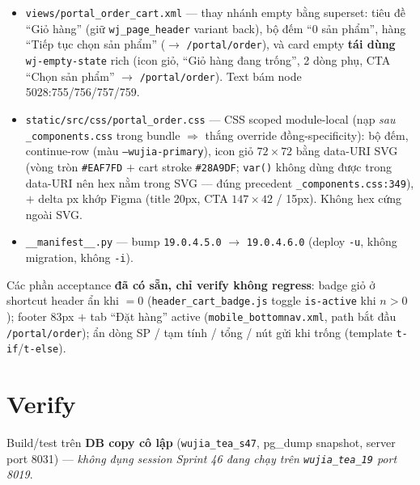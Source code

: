 \begin{itemize}
  \item \texttt{views/portal\_order\_cart.xml} --- thay nhánh empty bằng superset: tiêu đề
    ``Giỏ hàng'' (giữ \texttt{wj\_page\_header} variant back), bộ đếm ``0 sản phẩm'', hàng
    ``Tiếp tục chọn sản phẩm'' ($\rightarrow$ \texttt{/portal/order}), và card empty
    \textbf{tái dùng} \texttt{wj-empty-state} rich (icon giỏ, ``Giỏ hàng đang trống'', 2 dòng
    phụ, CTA ``Chọn sản phẩm'' $\rightarrow$ \texttt{/portal/order}). Text bám node
    5028:755/756/757/759.
  \item \texttt{static/src/css/portal\_order.css} --- CSS scoped module-local (nạp \emph{sau}
    \texttt{\_components.css} trong bundle $\Rightarrow$ thắng override đồng-specificity):
    bộ đếm, continue-row (màu \texttt{--wujia-primary}), icon giỏ $72\times72$ bằng data-URI
    SVG (vòng tròn \texttt{\#EAF7FD} $+$ cart stroke \texttt{\#28A9DF}; \texttt{var()} không
    dùng được trong data-URI nên hex nằm trong SVG --- đúng precedent
    \texttt{\_components.css:349}), $+$ delta px khớp Figma (title 20px, CTA $147\times42$ /
    15px). Không hex cứng ngoài SVG.
  \item \texttt{\_\_manifest\_\_.py} --- bump \texttt{19.0.4.5.0} $\rightarrow$
    \texttt{19.0.4.6.0} (deploy \texttt{-u}, không migration, không \texttt{-i}).
\end{itemize}

Các phần acceptance \textbf{đã có sẵn, chỉ verify không regress}: badge giỏ ở shortcut header
ẩn khi $=0$ (\texttt{header\_cart\_badge.js} toggle \texttt{is-active} khi $n>0$); footer
83px $+$ tab ``Đặt hàng'' active (\texttt{mobile\_bottomnav.xml}, path bắt đầu
\texttt{/portal/order}); ẩn dòng SP / tạm tính / tổng / nút gửi khi trống (template
\texttt{t-if}/\texttt{t-else}).

\section{Verify}

Build/test trên \textbf{DB copy cô lập} (\texttt{wujia\_tea\_s47}, pg\_dump snapshot, server
port 8031) --- \emph{không đụng session Sprint 46 đang chạy trên \texttt{wujia\_tea\_19} port
8019}.

